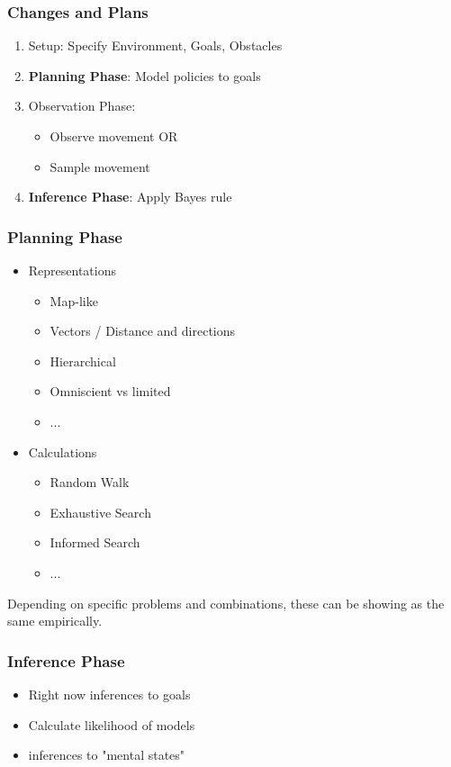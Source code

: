 \documentclass[11pt]{beamer}
\begin{document}
\begin{frame}
	\frametitle{Changes and Plans}
	\begin{enumerate}
		\item Setup: Specify Environment, Goals, Obstacles
		\item \textbf{{\Large Planning Phase}}: Model policies to goals
		\item Observation Phase:
		\begin{itemize}
			\item Observe movement OR
			\item Sample movement
		\end{itemize}
		\item \textbf{{\Large Inference Phase}}:
		Apply Bayes rule
	\end{enumerate}
\end{frame}

\begin{frame}
	\frametitle{Planning Phase}
	\begin{itemize}
		\item Representations
		\begin{itemize}
			\item Map-like
			\item Vectors / Distance and directions
			\item Hierarchical
			\item Omniscient vs limited
			\item ...
		\end{itemize}
		\item Calculations
		\begin{itemize}
			\item Random Walk
			\item Exhaustive Search
			\item Informed Search
			\item ...
		\end{itemize}
	\end{itemize}
	Depending on specific problems and combinations, these can be showing as the same empirically.
\end{frame}

\begin{frame}
	\frametitle{Inference Phase}
	\begin{itemize}
		\item Right now inferences to goals
		\item Calculate likelihood of models
		\item inferences to "mental states"
	\end{itemize}
\end{frame}
\end{document}

